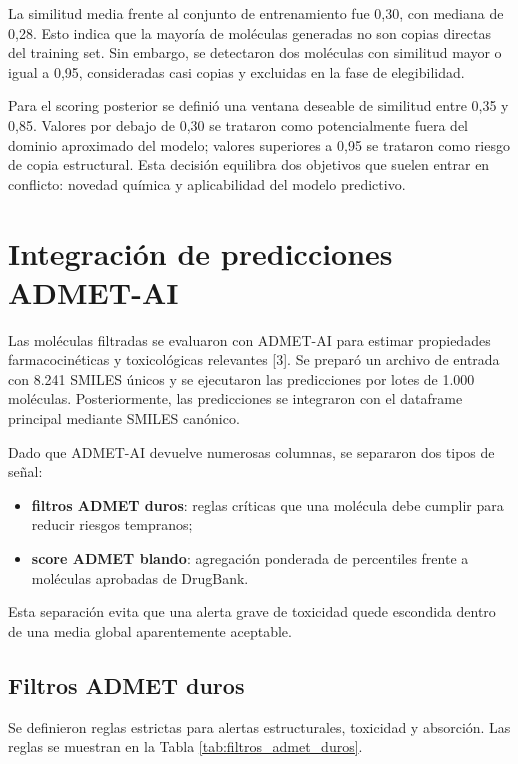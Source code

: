 \documentclass[IB]{TFUOC}%
\begin{document}
La similitud media frente al conjunto de entrenamiento fue 0,30, con mediana de 0,28. Esto indica que la mayoría de moléculas generadas no son copias directas del training set. Sin embargo, se detectaron dos moléculas con similitud mayor o igual a 0,95, consideradas casi copias y excluidas en la fase de elegibilidad.

Para el scoring posterior se definió una ventana deseable de similitud entre 0,35 y 0,85. Valores por debajo de 0,30 se trataron como potencialmente fuera del dominio aproximado del modelo; valores superiores a 0,95 se trataron como riesgo de copia estructural. Esta decisión equilibra dos objetivos que suelen entrar en conflicto: novedad química y aplicabilidad del modelo predictivo.

\section{Integración de predicciones ADMET-AI}

Las moléculas filtradas se evaluaron con ADMET-AI para estimar propiedades farmacocinéticas y toxicológicas relevantes [3]. Se preparó un archivo de entrada con 8.241 SMILES únicos y se ejecutaron las predicciones por lotes de 1.000 moléculas. Posteriormente, las predicciones se integraron con el dataframe principal mediante SMILES canónico.

Dado que ADMET-AI devuelve numerosas columnas, se separaron dos tipos de señal:

\begin{itemize}
    \item \textbf{filtros ADMET duros}: reglas críticas que una molécula debe cumplir para reducir riesgos tempranos;
    \item \textbf{score ADMET blando}: agregación ponderada de percentiles frente a moléculas aprobadas de DrugBank.
\end{itemize}

Esta separación evita que una alerta grave de toxicidad quede escondida dentro de una media global aparentemente aceptable.

\subsection{Filtros ADMET duros}

Se definieron reglas estrictas para alertas estructurales, toxicidad y absorción. Las reglas se muestran en la Tabla \ref{tab:filtros_admet_duros}.
\end{document}
